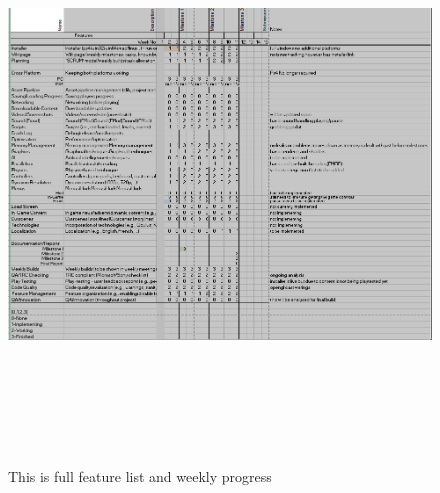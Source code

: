 \documentclass[conference,backref=page]{acmsiggraph}
\begin{document}
\begin{figure}[ht!]
	\includegraphics[height=6.0in]{images/planning}
	\caption{This is full feature list and weekly progress}
	\label{fig:planning}
\end{figure}
\end{document}
